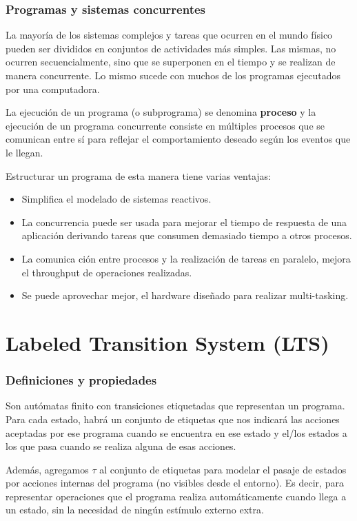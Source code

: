 \newpage
\section{Programas y sistemas concurrentes}
La mayoría de los sistemas complejos y tareas que ocurren en el mundo físico pueden ser divididos en conjuntos de actividades más simples. Las mismas, no ocurren secuencialmente, sino que se superponen en el tiempo y se realizan de manera concurrente. Lo mismo sucede con muchos de los programas ejecutados por una computadora.

La ejecución de un programa (o subprograma) se denomina \textbf{proceso} y la ejecución de un programa concurrente consiste en múltiples procesos que se comunican entre sí para reflejar el comportamiento deseado según los eventos que le llegan. 

Estructurar un programa de esta manera tiene varias ventajas:
\begin{itemize}
\item Simplifica el modelado de sistemas reactivos.
\item La concurrencia puede ser usada para mejorar el tiempo de respuesta de una aplicación derivando tareas que consumen demasiado tiempo a otros procesos.
\item La comunica
ción entre procesos y la realización de tareas en paralelo, mejora el throughput de operaciones realizadas.
\item Se puede aprovechar mejor, el hardware diseñado para realizar multi-tasking.
\end{itemize} 

\newpage
\part{Labeled Transition System (LTS)}

\section{Definiciones y propiedades}

Son autómatas finito con transiciones etiquetadas que representan un programa. Para cada estado, habrá un conjunto de etiquetas que nos indicará las acciones aceptadas por ese programa cuando se encuentra en ese estado y el/los estados a los que pasa cuando se realiza alguna de esas acciones.

Además, agregamos $\tau$ al conjunto de etiquetas para modelar el pasaje de estados por acciones internas del programa (no visibles desde el entorno). Es decir, para representar operaciones que el programa realiza automáticamente cuando llega a un estado, sin la necesidad de ningún estímulo externo extra.

